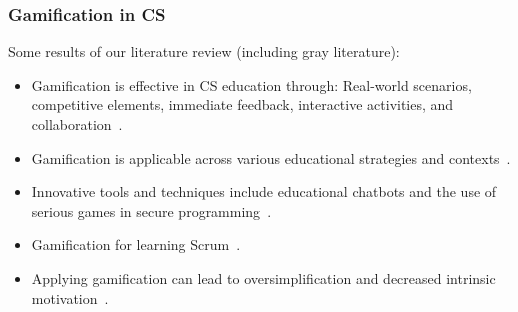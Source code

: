 \documentclass[aspectratio=169]{beamer}
\begin{document}
\begin{frame}%
    \frametitle{Gamification in CS}
    Some results of our literature review (including gray literature):
    \begin{itemize}
        \item Gamification is effective in CS education through: Real-world scenarios, competitive elements, immediate feedback, interactive activities, and collaboration~\cite{8658524}.
        \item Gamification is applicable across various educational strategies and contexts~\cite{informatics9040075, hirsh2022, Tan_Chong_2023}.%
        \item Innovative tools and techniques include educational chatbots and the use of serious games in secure programming~\cite{10.1145/3350768.3352456,8802503}.
        \item Gamification for learning Scrum~\cite{10.1145/3629479.3629480}.
        \item Applying gamification can lead to oversimplification and decreased intrinsic motivation~\cite{8658524}.
    \end{itemize}
\end{frame}
\end{document}
